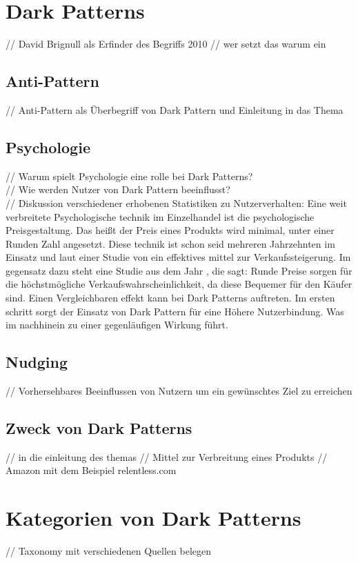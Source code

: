 \documentclass[conference,compsoc,final,a4paper]{IEEEtran}
\begin{document}
\section{Dark Patterns}
// David Brignull als Erfinder des Begriffs 2010
// wer setzt das warum ein
\subsection{Anti-Pattern}
// Anti-Pattern als Überbegriff von Dark Pattern und Einleitung in das Thema
\subsection{Psychologie}
// Warum spielt Psychologie eine rolle bei Dark Patterns?
\\// Wie werden Nutzer von Dark Pattern beeinflusst?
\\// Diskussion verschiedener erhobenen Statistiken zu Nutzerverhalten:
Eine weit verbreitete Psychologische technik im Einzelhandel ist die psychologische Preisgestaltung. Das heißt der Preis eines Produkts wird minimal, unter einer Runden Zahl angesetzt. Diese technik ist schon seid mehreren Jahrzehnten im Einsatz und laut einer Studie von  ein effektives mittel zur Verkaufssteigerung. \autocite*{Bizer_2005} Im gegensatz dazu steht eine Studie aus dem Jahr , die sagt: Runde Preise sorgen für die höchstmögliche Verkaufswahrscheinlichkeit, da diese Bequemer für den Käufer sind. \autocite*{Wieseke_2015}
Einen Vergleichbaren effekt kann bei Dark Patterns auftreten. Im ersten schritt sorgt der Einsatz von Dark Pattern für eine Höhere Nutzerbindung. Was im nachhinein zu einer gegenläufigen Wirkung führt. \autocite*{M.Bhoot2020}
\subsection{Nudging}
// Vorhersehbares Beeinflussen von Nutzern um ein gewünschtes Ziel zu erreichen
\subsection{Zweck von Dark Patterns}
// in die einleitung des themas
// Mittel zur Verbreitung eines Produkts
// Amazon mit dem Beispiel relentless.com

\section{Kategorien von Dark Patterns}
// Taxonomy mit verschiedenen Quellen belegen \autocite*{Gray_2018,M.Bhoot2020}
\end{document}
